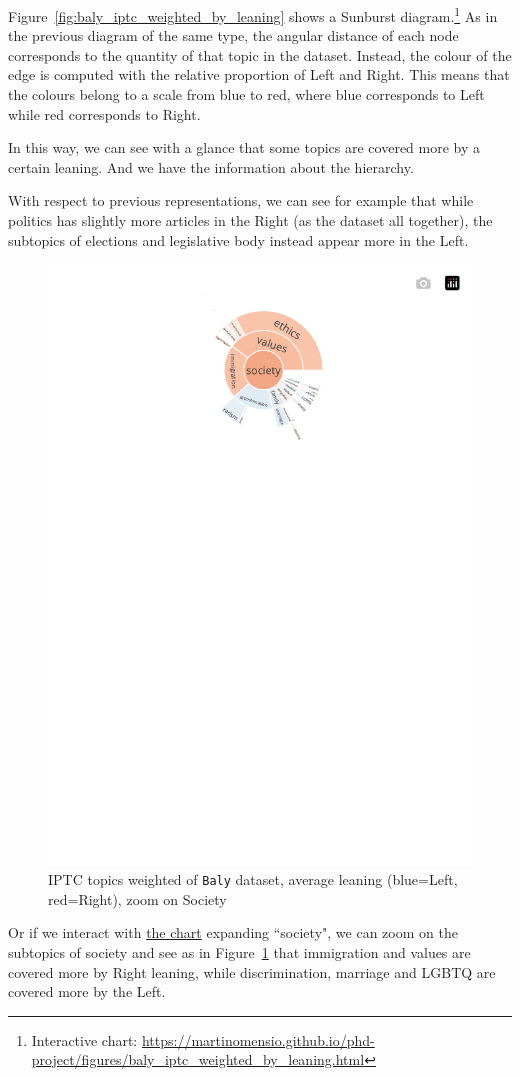 Figure~\ref{fig:baly_iptc_weighted_by_leaning} shows a Sunburst diagram.\footnote{Interactive chart: \url{https://martinomensio.github.io/phd-project/figures/baly_iptc_weighted_by_leaning.html}}
As in the previous diagram of the same type, the angular distance of each node corresponds to the quantity of that topic in the dataset.
Instead, the colour of the edge is computed with the relative proportion of Left and Right. This means that the colours belong to a scale from blue to red, where blue corresponds to Left while red corresponds to Right.

In this way, we can see with a glance that some topics are covered more by a certain leaning. And we have the information about the hierarchy.

With respect to previous representations, we can see for example that while politics has slightly more articles in the Right (as the dataset all together), the subtopics of elections and legislative body instead appear more in the Left.

\begin{figure}[!htbp]
    \centering
    \includegraphics[trim={0 0 0 0},clip,width=0.5\linewidth]{figures/baly_iptc_weighted_by_leaning_zoom_society.pdf}
    \caption{IPTC topics weighted of \texttt{Baly} dataset, average leaning (blue=Left, red=Right), zoom on Society}
    \label{fig:baly_iptc_weighted_by_leaning_zoom_society}
\end{figure}

Or if we interact with \href{https://martinomensio.github.io/phd-project/figures/baly_iptc_weighted_by_leaning.html}{the chart} expanding ``society", we can zoom on the subtopics of society and see as in Figure~\ref{fig:baly_iptc_weighted_by_leaning_zoom_society} that immigration and values are covered more by Right leaning, while discrimination, marriage and LGBTQ are covered more by the Left. 

